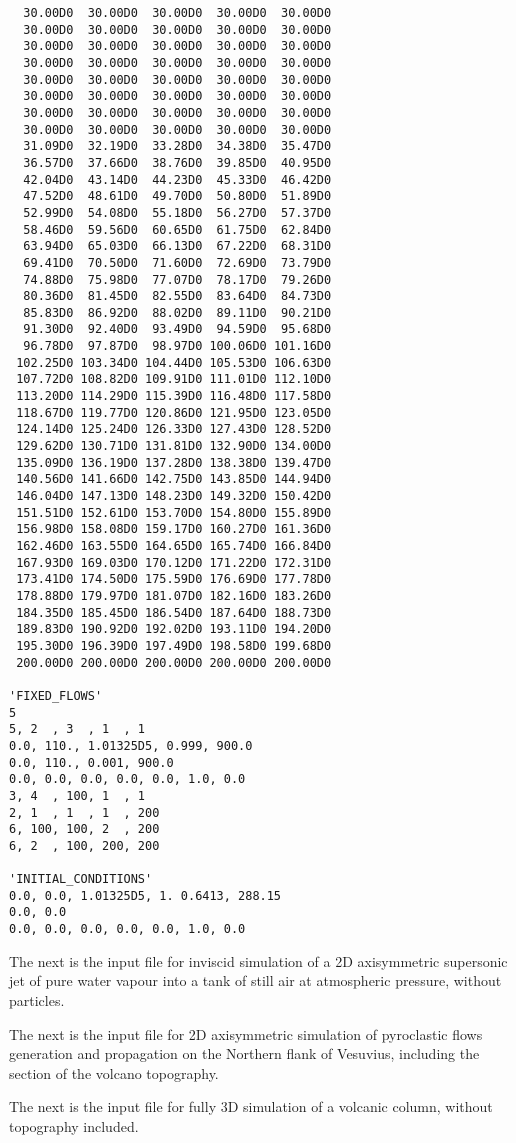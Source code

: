 \begin{verbatim}
  30.00D0  30.00D0  30.00D0  30.00D0  30.00D0
  30.00D0  30.00D0  30.00D0  30.00D0  30.00D0
  30.00D0  30.00D0  30.00D0  30.00D0  30.00D0
  30.00D0  30.00D0  30.00D0  30.00D0  30.00D0
  30.00D0  30.00D0  30.00D0  30.00D0  30.00D0
  30.00D0  30.00D0  30.00D0  30.00D0  30.00D0
  30.00D0  30.00D0  30.00D0  30.00D0  30.00D0
  30.00D0  30.00D0  30.00D0  30.00D0  30.00D0
  31.09D0  32.19D0  33.28D0  34.38D0  35.47D0
  36.57D0  37.66D0  38.76D0  39.85D0  40.95D0
  42.04D0  43.14D0  44.23D0  45.33D0  46.42D0
  47.52D0  48.61D0  49.70D0  50.80D0  51.89D0
  52.99D0  54.08D0  55.18D0  56.27D0  57.37D0
  58.46D0  59.56D0  60.65D0  61.75D0  62.84D0
  63.94D0  65.03D0  66.13D0  67.22D0  68.31D0
  69.41D0  70.50D0  71.60D0  72.69D0  73.79D0
  74.88D0  75.98D0  77.07D0  78.17D0  79.26D0
  80.36D0  81.45D0  82.55D0  83.64D0  84.73D0
  85.83D0  86.92D0  88.02D0  89.11D0  90.21D0
  91.30D0  92.40D0  93.49D0  94.59D0  95.68D0
  96.78D0  97.87D0  98.97D0 100.06D0 101.16D0
 102.25D0 103.34D0 104.44D0 105.53D0 106.63D0
 107.72D0 108.82D0 109.91D0 111.01D0 112.10D0
 113.20D0 114.29D0 115.39D0 116.48D0 117.58D0
 118.67D0 119.77D0 120.86D0 121.95D0 123.05D0
 124.14D0 125.24D0 126.33D0 127.43D0 128.52D0
 129.62D0 130.71D0 131.81D0 132.90D0 134.00D0
 135.09D0 136.19D0 137.28D0 138.38D0 139.47D0
 140.56D0 141.66D0 142.75D0 143.85D0 144.94D0
 146.04D0 147.13D0 148.23D0 149.32D0 150.42D0
 151.51D0 152.61D0 153.70D0 154.80D0 155.89D0
 156.98D0 158.08D0 159.17D0 160.27D0 161.36D0
 162.46D0 163.55D0 164.65D0 165.74D0 166.84D0
 167.93D0 169.03D0 170.12D0 171.22D0 172.31D0
 173.41D0 174.50D0 175.59D0 176.69D0 177.78D0
 178.88D0 179.97D0 181.07D0 182.16D0 183.26D0
 184.35D0 185.45D0 186.54D0 187.64D0 188.73D0
 189.83D0 190.92D0 192.02D0 193.11D0 194.20D0
 195.30D0 196.39D0 197.49D0 198.58D0 199.68D0
 200.00D0 200.00D0 200.00D0 200.00D0 200.00D0

'FIXED_FLOWS'
5
5, 2  , 3  , 1  , 1
0.0, 110., 1.01325D5, 0.999, 900.0
0.0, 110., 0.001, 900.0
0.0, 0.0, 0.0, 0.0, 0.0, 1.0, 0.0  
3, 4  , 100, 1  , 1
2, 1  , 1  , 1  , 200
6, 100, 100, 2  , 200
6, 2  , 100, 200, 200

'INITIAL_CONDITIONS'
0.0, 0.0, 1.01325D5, 1. 0.6413, 288.15 
0.0, 0.0
0.0, 0.0, 0.0, 0.0, 0.0, 1.0, 0.0
\end{verbatim}

\newpage
The next is the input file for inviscid simulation of a 2D axisymmetric
supersonic jet of pure water vapour into a tank of still air 
at atmospheric pressure, without particles. 

\newpage
The next is the input file for 2D axisymmetric simulation of pyroclastic
flows generation and propagation on the Northern flank of Vesuvius,
including the section of the volcano topography.

\newpage
The next is the input file for fully 3D simulation of a volcanic column,
without topography included.
